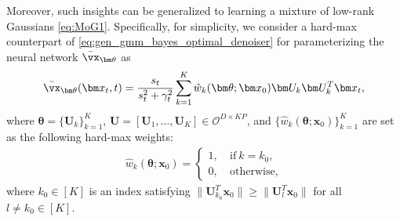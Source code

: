 \documentclass[../../book-main.tex]{subfiles}
\begin{document}
Moreover, such insights can be generalized to learning a mixture of low-rank Gaussians \eqref{eq:MoG1}. Specifically, for simplicity, we consider a hard-max counterpart of \eqref{eq:gen_gmm_bayes_optimal_denoiser} for parameterizing the neural network $\bar{\vx}_{\bm \theta}$ as
    \begin{align}\label{eq:para MoG}
     \bar{\vx}_{\bm \theta}(\bm x_t, t)  = \dfrac{s_t}{s_t^2 + \gamma_t^2} \sum_{k=1}^K \hat{w}_k(\bm \theta; \bm x_0) \bm U_k\bm U_k^T\bm x_t, 
    \end{align}
where $\bm \theta = \{\bm U_k\}_{k=1}^K$, $\bm U = [\bm U_1,\dots,\bm U_K] \in \mathcal{O}^{D \times KP }$, and $\{ \hat{w}_k(\bm \theta; \bm x_0) \}_{k=1}^K$ are set as the following hard-max weights: 
\begin{align}\label{eq:wk1}
\hat{w}_k(\bm \theta; \bm x_0) = \begin{cases}
1,\ & \text{if}\ k=k_0, \\
0,\ & \text{otherwise},
\end{cases}
\end{align}
where $k_0 \in [K]$ is an index satisfying $\|\bm U_{k_0}^T\bm x_0\| \ge  \|\bm U_l^T\bm x_0\|$ for all $l \neq k_0 \in [K]$. 
\end{document}
